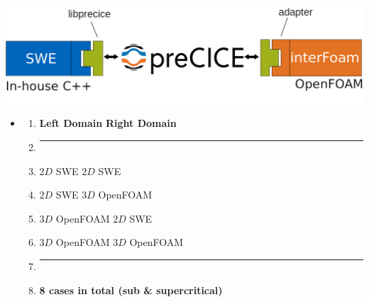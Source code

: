 \begin{frame}
\begin{minipage}{0.45\textwidth}
\centering
 \includegraphics[width=1\textwidth]{Resources/Images/pash2.png}
\end{minipage}
\hspace{1cm}
\begin{minipage}{0.42\textwidth}
\begin{itemize}
\item<2->[]
\begin{tcolorbox}[coltitle=white,title= \textbf{Domain-mapping cases},colframe=black, colback=white] 
\vspace{0.5cm}
\begin{enumerate}
\setlength{\itemsep}{0.1cm}
\item[] \textbf{Left Domain} \qquad  \textbf{Right Domain}
\item[] \par\noindent\rule{0.85\textwidth}{0.5pt}
\item[] $2D$ SWE  \qquad \quad  {} \quad $2D$  SWE 
\setlength{\itemsep}{1cm}
\item[] {$2D$ SWE  \qquad \quad {}  \quad$3D$ OpenFOAM}   
\item[] {$3D$ OpenFOAM    \quad   $2D$ SWE}
\item[] $3D$ OpenFOAM    \quad  $3D$  OpenFOAM
\setlength{\itemsep}{0.05cm}
\item[] \par\noindent\rule{0.85\textwidth}{1.5pt} 
\item[] \quad  \textbf{8 cases in total \quad \footnotesize{(sub \& supercritical)}}
\end{enumerate}
\end{tcolorbox}
\end{itemize}
\end{minipage}
\end{frame}

